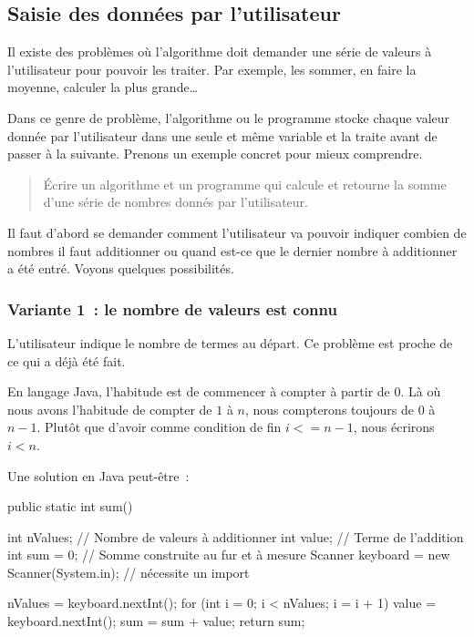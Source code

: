 \subsection{Saisie des données par l'utilisateur}

	Il existe des problèmes où l’algorithme doit demander une série de valeurs
	à l’utilisateur pour pouvoir les traiter.  Par exemple, les sommer, en faire
	la moyenne, calculer la plus grande\dots
	
	Dans ce genre de problème, l'algorithme ou le programme stocke chaque valeur
	donnée par l’utilisateur dans une seule et même variable et la traite avant
	de passer à la suivante.  Prenons un exemple concret pour mieux comprendre.

	\begin{quote}
	Écrire un algorithme et un programme qui calcule et retourne 
	la somme d’une série de nombres donnés par l’utilisateur. 
	\end{quote}

	Il faut d’abord se demander comment l’utilisateur va pouvoir indiquer
	combien de nombres il faut additionner ou quand est-ce que le dernier nombre
	à additionner a été entré.  Voyons quelques possibilités.
	

	\subsubsection{Variante 1~: le nombre de valeurs est connu} 
	
		L’utilisateur indique le nombre de termes au départ.
		Ce problème est proche de ce qui a déjà été fait.
		
		En langage Java, l'habitude est de commencer à compter à partir de 0.
		Là où nous avons l'habitude de compter de $1$ à $n$, nous compterons
		toujours de $0$ à $n-1$. Plutôt que d'avoir comme condition de fin $i
		<= n - 1$, nous écrirons $i < n$.

		Une solution en Java peut-être~:

		\begin{java}
public static int sum(){
	int nValues;		// Nombre de valeurs à additionner
	int value;			// Terme de l'addition
	int sum = 0;		// Somme construite au fur et à mesure
	Scanner keyboard = new Scanner(System.in); // nécessite un import
	
	nValues = keyboard.nextInt();
	for  (int i = 0; i < nValues; i = i + 1){
		value = keyboard.nextInt();
		sum = sum + value;
	}
	return sum;
}
		\end{java}


